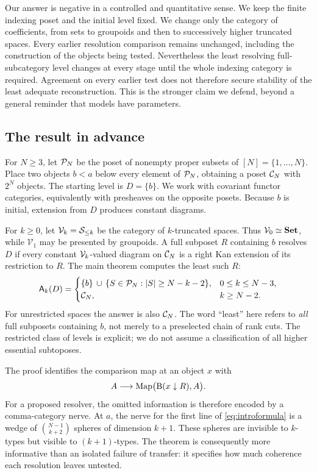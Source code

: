 Our answer is negative in a controlled and quantitative sense. We keep the
finite indexing poset and the initial level fixed. We change only the category
of coefficients, from sets to groupoids and then to successively higher
truncated spaces. Every earlier resolution comparison remains unchanged,
including the construction of the objects being tested. Nevertheless the
least resolving full-subcategory level changes at every stage until the whole
indexing category is required. Agreement on every earlier test does not
therefore secure stability of the least adequate reconstruction. This is the
stronger claim we defend, beyond a general reminder that models have
parameters.

\subsection{The result in advance}

For $N\geq3$, let $\mathcal P_N$ be the poset of nonempty proper subsets of
$[N]=\{1,\ldots,N\}$. Place two objects $b<a$ below every element of
$\mathcal P_N$, obtaining a poset $\mathcal C_N$ with $2^N$ objects. The starting level
is $D=\{b\}$. We work with covariant functor categories, equivalently with
presheaves on the opposite posets. Because $b$ is initial, extension from $D$
produces constant diagrams.

For $k\geq0$, let $\mathcal V_k=\mathcal S_{\leq k}$ be the category of $k$-truncated
spaces. Thus $\mathcal V_0\simeq\mathbf{Set}$, while $\mathcal V_1$ may be presented
by groupoids. A full subposet $R$ containing $b$ resolves $D$ if every constant
$\mathcal V_k$-valued diagram on $\mathcal C_N$ is a right Kan extension of its restriction
to $R$. The main theorem computes the least such $R$:
\begin{equation}\label{eq:introformula}
\mathsf A_k(D)=
\begin{cases}
\{b\}\,\cup\,\{S\in\mathcal P_N:|S|\geq N-k-2\},&0\leq k\leq N-3,\\
\mathcal C_N,&k\geq N-2.
\end{cases}
\end{equation}
For unrestricted spaces the answer is also $\mathcal C_N$. The word ``least''
here refers to \emph{all} full subposets containing $b$, not merely to a
preselected chain of rank cuts. The restricted class of levels is explicit;
we do not assume a classification of all higher essential subtoposes.

The proof identifies the comparison map at an object $x$ with
\[
A\longrightarrow\operatorname{Map}\bigl(\mathrm B(x\downarrow R),A\bigr).
\]
For a proposed resolver, the omitted information is therefore encoded by a
comma-category nerve. At $a$, the nerve for the first line of
\eqref{eq:introformula} is a wedge of
$\binom{N-1}{k+2}$ spheres of dimension $k+1$. These spheres are invisible
to $k$-types but visible to $(k+1)$-types. The theorem is consequently more
informative than an isolated failure of transfer: it specifies how much
coherence each resolution leaves untested.

